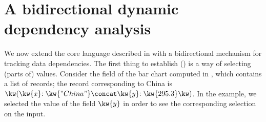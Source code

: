 \section{A bidirectional dynamic dependency analysis}
\label{sec:data-dependencies}

We now extend the core language described in  with a bidirectional mechanism for tracking data dependencies. The first thing to establish () is a way of selecting (parts of) values. Consider the  field of the bar chart computed in , which contains a list of records; the record corresponding to China is $\exRec{\bind{\kw{x}}{\kw{"China"}} \concat \bind{\kw{y}}{\kw{295.3}}}$. In the example, we selected the value of the field $\kw{y}$ in order to see the corresponding selection on the input.




